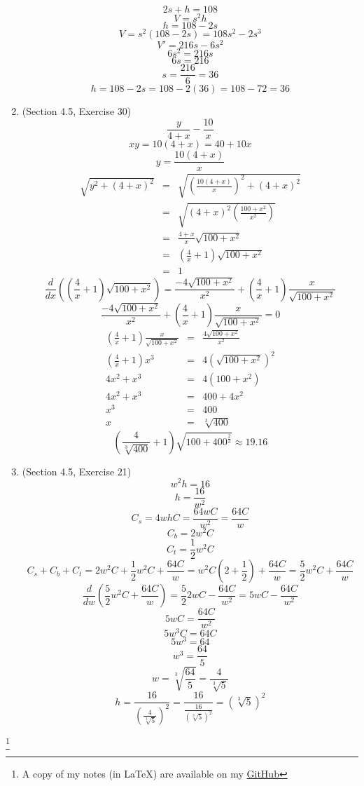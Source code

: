 \documentclass{article}
\newcommand\blfootnote[1]{
    \begingroup
    \renewcommand\thefootnote{}\footnote{#1}
    \addtocounter{footnote}{-1}
    \endgroup
}
\begin{document}
\begin{enumerate}
        $$2s + h = 108$$
        $$V = s^2h$$
        $$h = 108 - 2s$$
        $$V = s^2\left(108 - 2s\right) = 108s^2 - 2s^3$$
        $$V' = 216s - 6s^2$$
        $$6s^2 = 216s$$
        $$6s = 216$$
        $$s = \frac{216}{6} = 36$$
        $$h = 108 - 2s = 108 - 2\left(36\right) = 108-72 = 36$$
    \item (Section 4.5, Exercise 30)
        $$\frac{y}{4 + x} - \frac{10}{x}$$
        $$xy = 10\left(4 + x\right) = 40 + 10x$$
        $$y = \frac{10\left(4 + x\right)}{x}$$
        \begin{eqnarray}
            \sqrt{y^2 + \left(4 + x\right)^2} &=& \sqrt{\left(\frac{10\left(4 + x\right)}{x}\right)^2 + \left(4 + x\right)^2} \\
                                              &=& \sqrt{\left(4 + x\right)^2\left(\frac{100 + x^2}{x^2}\right)} \\
                                              &=& \frac{4 + x}{x}\sqrt{100 + x^2} \\
                                              &=& \left(\frac{4}{x} + 1\right)\sqrt{100 + x^2} \\
                                              &=& 1
        \end{eqnarray}
        $$\frac{d}{dx}\left(\left(\frac{4}{x} + 1\right)\sqrt{100 + x^2}\right) = \frac{-4\sqrt{100 + x^2}}{x^2} + \left(\frac{4}{x} + 1\right)\frac{x}{\sqrt{100+x^2}}$$
        $$\frac{-4\sqrt{100 + x^2}}{x^2} + \left(\frac{4}{x} + 1\right)\frac{x}{\sqrt{100+x^2}} = 0$$
        \begin{eqnarray}
            \left(\frac{4}{x} + 1\right)\frac{x}{\sqrt{100+x^2}} &=& \frac{4\sqrt{100 + x^2}}{x^2} \\
            \left(\frac{4}{x} + 1\right)x^3 &=& 4\left(\sqrt{100 + x^2}\right)^2 \\
            4x^2 + x^3 &=& 4\left(100 + x^2\right) \\
            4x^2 + x^3 &=& 400 + 4x^2 \\
            x^3 &=& 400 \\
            x &=& \sqrt[3]{400}
        \end{eqnarray}
        $$\left(\frac{4}{\sqrt[3]{400}} + 1\right)\sqrt{100 + 400^{\frac{2}{3}}} \approx 19.16$$
    \item (Section 4.5, Exercise 21)
        $$w^2h = 16$$
        $$h = \frac{16}{w^2}$$
        $$C_s = 4whC = \frac{64wC}{w^2} = \frac{64C}{w}$$
        $$C_b = 2w^2C$$
        $$C_t = \frac{1}{2}w^2C$$
        $$C_s + C_b + C_t = 2w^2C + \frac{1}{2}w^2C + \frac{64C}{w} = w^2C\left(2 + \frac{1}{2}\right) + \frac{64C}{w} = \frac{5}{2}w^2C + \frac{64C}{w}$$
        $$\frac{d}{dw}\left(\frac{5}{2}w^2C + \frac{64C}{w}\right) = \frac{5}{2}2wC - \frac{64C}{w^2} = 5wC - \frac{64C}{w^2}$$
        $$5wC = \frac{64C}{w^2}$$
        $$5w^3C = 64C$$
        $$5w^3 = 64$$
        $$w^3 = \frac{64}{5}$$
        $$w = \sqrt[3]{\frac{64}{5}} = \frac{4}{\sqrt[3]{5}}$$
        $$h = \frac{16}{\left(\frac{4}{\sqrt[3]{5}}\right)^2} = \frac{16}{\frac{16}{\left(\sqrt[3]{5}\right)^2}} = \left(\sqrt[3]{5}\right)^2$$
\end{enumerate}

\blfootnote{A copy of my notes (in \LaTeX) are available on my \href{https://github.com/onlinechronically/MATH-211}{GitHub}}
\end{document}
